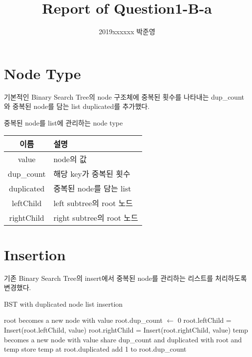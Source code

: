 \documentclass[a4paper, 11pt]{article}
\title{Report of Question1-B-a}
\author{2019xxxxxx 박준영}
\date{}
\begin{document}
\maketitle


\section{Node Type}
기본적인 Binary Search Tree의 node 구조체에 중복된 횟수를 나타내는 dup\_count와 중복된 node를 담는 list duplicated를 추가했다.
\\

\begin{center}
	\begin{threeparttable}
		\caption{중복된 node를 list에 관리하는 node type}
		\begin{tabular}{|c|l|}
			\hline
			이름 & 설명\\
			\hline
			value & node의 값\\
			dup\_count & 해당 key가 중복된 횟수\\
			duplicated & 중복된 node를 담는 list\\
			leftChild & left subtree의 root 노드\\
			rightChild & right subtree의 root 노드\\
		\hline
		\end{tabular}
	\end{threeparttable}
\end{center}

\section{Insertion}
기존 Binary Search Tree의 insert에서 중복된 node를 관리하는 리스트를 처리하도록 변경했다.
\\

\begin{algorithm}
	\caption{BST with duplicated node list insertion}
	\begin{algorithmic}
				\State root becomes a new node with value
				\State root.dup\_count $\gets$ 0
				\State root.leftChild = Insert(root.leftChild, value)
				\State root.rightChild = Insert(root.rightChild, value)
			\Else
				\State temp becomes a new node with value
				\State share dup\_count and duplicated with root and temp
				\State store temp at root.duplicated
				\State add 1 to root.dup\_count
			\EndIf
			
			\State {}
		\EndFunction
	\end{algorithmic}
\end{algorithm}
\pagebreak
\end{document}
